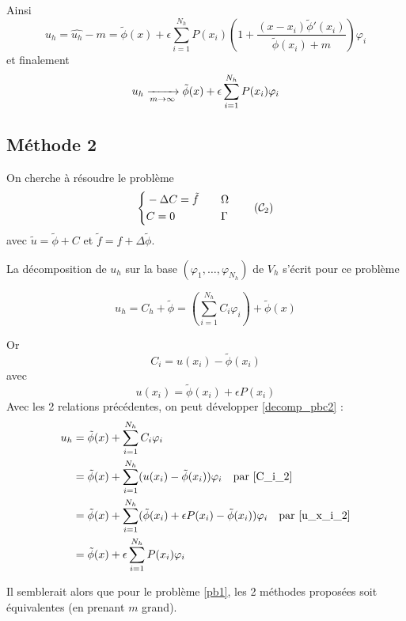 \documentclass[french]{article}
\begin{document}
	Ainsi
	$$u_h=\hat{u_h}-m=\tilde{\phi}(x)+\epsilon\sum_{i=1}^{N_h}P(x_i)\left(1+\frac{(x-x_i)\tilde{\phi}'(x_i)}{\tilde{\phi}(x_i)+m}\right)\varphi_i$$
	et finalement
	$$u_h\xrightarrow[m\to\infty]{} \tilde{\phi}(x)+\epsilon\sum_{i=1}^{N_h}P(x_i)\varphi_i \\ $$
	
	
	\subsection*{Méthode 2}
	
	On cherche à résoudre le problème
	\begin{equation}
		\left\{\begin{aligned}
			&-\Delta C=\tilde{f} \quad &&\Omega \\
			&C=0 \quad &&\Gamma
		\end{aligned}\right. \tag{$\mathcal{C}_2$}
	\end{equation}
	avec $\tilde{u}=\tilde{\phi}+C$ et $\tilde{f}=f+\Delta\tilde{\phi}$.
	
	La décomposition de $u_h$ sur la base $(\varphi_1,\dots,\varphi_{N_h})$ de $V_h$ s'écrit pour ce problème
	
	\begin{equation}
		u_h=C_h+\tilde{\phi}=\left(\sum_{i=1}^{N_h}C_i\varphi_i\right)+\tilde{\phi}(x) \label{decomp_pbc2}
	\end{equation}
	
	Or 
	\begin{equation}
		C_i=u(x_i)-\tilde{\phi}(x_i) \label{C_i_2}
	\end{equation}
	avec
	\begin{equation}
		u(x_i)=\tilde{\phi}(x_i)+\epsilon P(x_i) \label{u_x_i_2}
	\end{equation}
	Avec les 2 relations précédentes, on peut développer \ref{decomp_pbc2} :
	\begin{align*}
		u_h&=\tilde{\phi}(x)+\sum_{i=1}^{N_h}C_i\varphi_i \\
		&=\tilde{\phi}(x)+\sum_{i=1}^{N_h}(u(x_i)-\tilde{\phi}(x_i))\varphi_i \quad \text{par \ref{C_i_2}} \\
		&=\tilde{\phi}(x)+\sum_{i=1}^{N_h}(\tilde{\phi}(x_i)+\epsilon P(x_i)-\tilde{\phi}(x_i))\varphi_i \quad \text{par \ref{u_x_i_2}} \\
		&=\tilde{\phi}(x)+\epsilon\sum_{i=1}^{N_h} P(x_i)\varphi_i
	\end{align*}
	
	Il semblerait alors que pour le problème \ref{pb1}, les 2 méthodes proposées soit équivalentes (en prenant $m$ grand).
\end{document}
